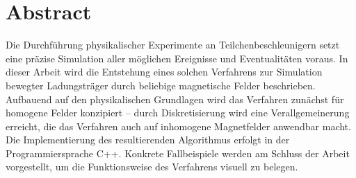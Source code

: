\chapter*{Abstract}

Die Durchf\"uhrung physikalischer Experimente an Teilchenbeschleunigern setzt eine pr\"azise Simulation
aller m\"oglichen Ereignisse und Eventualit\"aten voraus. In dieser Arbeit wird die Entstehung eines solchen Verfahrens zur Simulation
bewegter Ladungstr\"ager durch beliebige magnetische Felder beschrieben. Aufbauend auf den physikalischen Grundlagen
wird das Verfahren zun\"achst f\"ur homogene Felder konzipiert -- durch Diskretisierung wird eine Verallgemeinerung erreicht,
die das Verfahren auch auf inhomogene Magnetfelder anwendbar macht. Die Implementierung des resultierenden Algorithmus erfolgt
in der Programmiersprache C++. Konkrete Fallbeispiele werden am Schluss der
Arbeit vorgestellt, um die Funktionsweise des Verfahrens visuell zu belegen.
